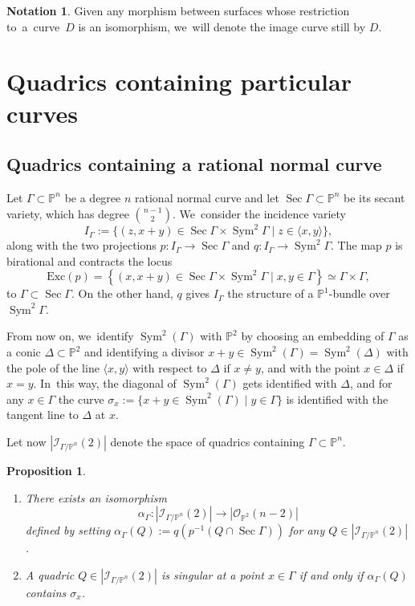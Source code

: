 \documentclass[JEP,XML,SOM,Unicode,NoEqCountersInSection,published]{cedram}
\theoremstyle{plain}
\newtheorem{prop}[thm]{Proposition}
\theoremstyle{definition}
\newtheorem{notation}[thm]{Notation}
\DeclareMathOperator{\Sec}{Sec}
\DeclareMathOperator{\Sym}{Sym}
\newcommand\PP{{\mathbb P}}
\newcommand\I{{\mathcal I}}
\begin{document}
\begin{notation}\label{pinguini}
Given any morphism between surfaces whose restriction to~a~curve~$D$ is an isomorphism, we~will denote the image curve still by $D$.
\end{notation}

\section{Quadrics containing particular curves}\label{figo}

\subsection{Quadrics containing a rational normal curve}\label{federico}

Let $\Gamma\subset \PP^n$ be a degree $n$ rational normal curve and let $\Sec\Gamma\subset \PP^n$ be its secant variety, which has degree $\binom{n-1}{2}$. We~consider the incidence variety
\[
I_\Gamma:=\bigl\{(z,x+y)\in \Sec\Gamma\times \Sym^2\Gamma\mid z\in \langle x,y\rangle \bigr\},
\]
along with the two projections $p:I_\Gamma\to \Sec\Gamma$ and $q: I_\Gamma\to \Sym^2\Gamma$. The map $p$ is birational and contracts the locus
\[
\mathrm{Exc} (p)=\left\{(x,x+y)\in \Sec\Gamma\times \Sym^2\Gamma\mid x,y\in \Gamma \right\}\simeq \Gamma\times \Gamma,
\]
to $\Gamma\subset \Sec\Gamma$. On the other hand, $q$ gives $I_\Gamma$ the structure of a $\PP^1$-bundle over $\Sym^2\Gamma$.

From now on, we~identify $\Sym^2(\Gamma)$ with $\PP^2$ by choosing an embedding of $\Gamma$ as a conic $\Delta\subset \PP^2$ and identifying a divisor $x+y\in \Sym^2(\Gamma)=\Sym^2(\Delta)$ with the pole of the line $\langle x,y\rangle$ with respect to $\Delta$ if $x\neq y$, and with the point $x\in \Delta$ if $x=y$. In~this way, the diagonal of $\Sym^2(\Gamma)$ gets identified with $\Delta$, and for any $x\in \Gamma$ the curve $\sigma_x:=\{x+y\in \Sym^2(\Gamma)\mid y\in \Gamma\}$ is identified with the tangent line to $\Delta$ at $x$.

Let now $|\I_{\Gamma/\PP^n}(2)|$ denote the space of quadrics containing $\Gamma\subset \PP^n$.

\skpt

\begin{prop}\label{razionale}
\begin{enumerate}
\item\label{razionalei}
There exists an isomorphism
\[
\alpha_\Gamma: |\I_{\Gamma/\PP^n}(2)|\to |\mathcal O_{\PP^2}(n-2)|
\]
defined by setting $\alpha_\Gamma(Q):=q(p^{-1}(Q\cap\Sec \Gamma))$ for any $Q\in |\I_{\Gamma/\PP^n}(2)|$.
\item\label{razionaleii}
A quadric $Q\in |\I_{\Gamma/\PP^n}(2)|$ is singular at a point $x\in \Gamma$ if and only if $\alpha_\Gamma(Q)$ contains $\sigma _x$.
\end{enumerate}
\end{prop}
\end{document}
